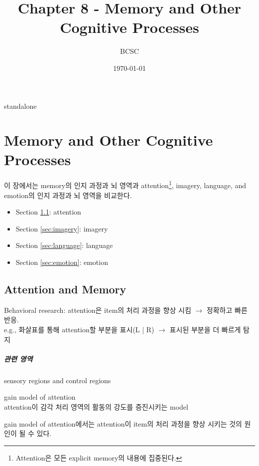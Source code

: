 \documentclass[../note.tex]{subfiles}
\title{Chapter 8 - Memory and Other Cognitive Processes}
\author{BCSC}
\date{\today}
\providecommand{\mainfile}{standalone}
\begin{document}
\ifx\mainfile\empty\else
    \maketitle
    \newpage
\fi

\setcounter{chapter}{7}
\chapter{Memory and Other Cognitive Processes}

이 장에서는 memory의 인지 과정과 뇌 영역과 attention\footnote{Attention은 모든 explicit memory의 
내용에 집중된다.}, imagery, language, and emotion의 인지 과정과 뇌 영역을 비교한다.

\begin{itemize}
  \item Section \ref{sec:attention}: attention
  \item Section \ref{sec:imagery}: imagery
  \item Section \ref{sec:language}: language
  \item Section \ref{sec:emotion}: emotion
\end{itemize}


\section{Attention and Memory}
\label{sec:attention}
Behavioral research: attention은 item의 처리 과정을 향상 시킴 $\longrightarrow$ 정확하고 빠른 반응.\\
e.g., 화살표를 통해 attention할 부분을 표시(L | R) $\rightarrow$ 표시된 부분을 더 빠르게 탐지\\

\paragraph{관련 영역}
sensory regions and control regions

\begin{definition}{gain model of attention}\\
  attention이 감각 처리 영역의 활동의 강도를 증진시키는 model
\end{definition}

gain model of attention에서는 attention이 item의 처리 과정을 향상 시키는 것의 원인이 될 수 있다.\\
\end{document}

